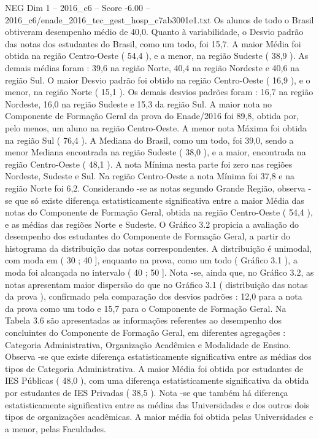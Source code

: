 \begin{textsample}{NEG Dim 1 – 2016\_c6 – Score -6.00 – 2016\_c6/enade\_2016\_tec\_gest\_hosp\_c7ab3001e1.txt}
Os alunos de todo o Brasil obtiveram desempenho médio de 40,0.
Quanto à variabilidade, o Desvio padrão das notas dos estudantes do Brasil, como um todo, foi 15,7.
A maior Média foi obtida na região Centro-Oeste ( 54,4 ), e a menor, na região Sudeste ( 38,9 ).
As demais médias foram : 39,6 na região Norte, 40,4 na região Nordeste e 40,6 na região Sul.
O maior Desvio padrão foi obtido na região Centro-Oeste ( 16,9 ), e o menor, na região Norte ( 15,1 ).
Os demais desvios padrões foram : 16,7 na região Nordeste, 16,0 na região Sudeste e 15,3 da região Sul.
A maior nota no Componente de Formação Geral da prova do Enade/2016 foi 89,8, obtida por, pelo menos, um aluno na região Centro-Oeste.
A menor nota Máxima foi obtida na região Sul ( 76,4 ).
A Mediana do Brasil, como um todo, foi 39,0, sendo a menor Mediana encontrada na região Sudeste ( 38,0 ), e a maior, encontrada na região Centro-Oeste ( 48,1 ).
A nota Mínima nesta parte foi zero nas regiões Nordeste, Sudeste e Sul.
Na região Centro-Oeste a nota Mínima foi 37,8 e na região Norte foi 6,2.
Considerando -se as notas segundo Grande Região, observa -se que só existe diferença estatisticamente significativa entre a maior Média das notas do Componente de Formação Geral, obtida na região Centro-Oeste ( 54,4 ), e as médias das regiões Norte e Sudeste.
O Gráfico 3.2 propicia a avaliação do desempenho dos estudantes do Componente de Formação Geral, a partir do histograma da distribuição das notas correspondentes.
A distribuição é unimodal, com moda em ( 30 ; 40 ], enquanto na prova, como um todo ( Gráfico 3.1 ), a moda foi alcançada no intervalo ( 40 ; 50 ].
Nota -se, ainda que, no Gráfico 3.2, as notas apresentam maior dispersão do que no Gráfico 3.1 ( distribuição das notas da prova ), confirmado pela comparação dos desvios padrões : 12,0 para a nota da prova como um todo e 15,7 para o Componente de Formação Geral.
Na Tabela 3.6 são apresentadas as informações referentes ao desempenho dos concluintes do Componente de Formação Geral, em diferentes agregações : Categoria Administrativa, Organização Acadêmica e Modalidade de Ensino.
Observa -se que existe diferença estatisticamente significativa entre as médias dos tipos de Categoria Administrativa.
A maior Média foi obtida por estudantes de IES Públicas ( 48,0 ), com uma diferença estatisticamente significativa da obtida por estudantes de IES Privadas ( 38,5 ).
Nota -se que também há diferença estatisticamente significativa entre as médias das Universidades e dos outros dois tipos de organizações acadêmicas.
A maior média foi obtida pelas Universidades e a menor, pelas Faculdades.

\end{textsample}
